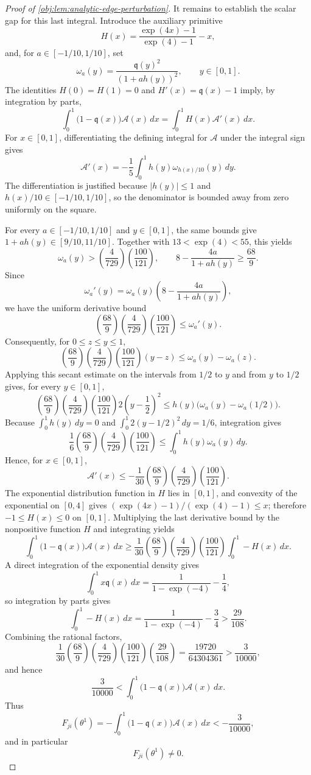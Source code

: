 \begin{proof}[Proof of \cref{obj:lem:analytic-edge-perturbation}]
It remains to establish the scalar gap for this last integral.  Introduce the auxiliary primitive
\[
H(x)=\frac{\exp(4x)-1}{\exp(4)-1}-x,
\]
and, for \(a\in[-1/10,1/10]\), set
\[
\omega_a(y)=\frac{\mathfrak q(y)^2}{(1+a h(y))^2},
\qquad y\in[0,1].
\]
The identities \(H(0)=H(1)=0\) and \(H'(x)=\mathfrak q(x)-1\) imply, by integration by parts,
\[
\int_0^1 \bigl(1-\mathfrak q(x)\bigr)\mathcal A(x)\,dx
=\int_0^1 H(x)\mathcal A'(x)\,dx .
\]
For \(x\in[0,1]\), differentiating the defining integral for \(\mathcal A\) under the integral sign gives
\[
\mathcal A'(x)
=-\frac15\int_0^1 h(y)\omega_{h(x)/10}(y)\,dy .
\]
The differentiation is justified because \(|h(y)|\le1\) and \(h(x)/10\in[-1/10,1/10]\), so the denominator is bounded away from zero uniformly on the square.

For every \(a\in[-1/10,1/10]\) and \(y\in[0,1]\), the same bounds give \(1+a h(y)\in[9/10,11/10]\).  Together with \(13<\exp(4)<55\), this yields
\[
\omega_a(y)>\left(\frac{4}{729}\right)\left(\frac{100}{121}\right),
\qquad
8-\frac{4a}{1+a h(y)}\ge \frac{68}{9}.
\]
Since
\[
\omega_a'(y)
=\omega_a(y)\left(8-\frac{4a}{1+a h(y)}\right),
\]
we have the uniform derivative bound
\[
\left(\frac{68}{9}\right)\left(\frac{4}{729}\right)\left(\frac{100}{121}\right)
\le \omega_a'(y).
\]
Consequently, for \(0\le z\le y\le1\),
\[
\left(\frac{68}{9}\right)\left(\frac{4}{729}\right)\left(\frac{100}{121}\right)(y-z)
\le \omega_a(y)-\omega_a(z).
\]
Applying this secant estimate on the intervals from \(1/2\) to \(y\) and from \(y\) to \(1/2\) gives, for every \(y\in[0,1]\),
\[
\left(\frac{68}{9}\right)\left(\frac{4}{729}\right)\left(\frac{100}{121}\right)2\left(y-\frac12\right)^2
\le h(y)\bigl(\omega_a(y)-\omega_a(1/2)\bigr).
\]
Because \(\int_0^1 h(y)\,dy=0\) and \(\int_0^1 2(y-1/2)^2\,dy=1/6\), integration gives
\[
\frac16\left(\frac{68}{9}\right)\left(\frac{4}{729}\right)\left(\frac{100}{121}\right)
\le
\int_0^1 h(y)\omega_a(y)\,dy .
\]
Hence, for \(x\in[0,1]\),
\[
\mathcal A'(x)
\le
-\frac1{30}\left(\frac{68}{9}\right)\left(\frac{4}{729}\right)\left(\frac{100}{121}\right).
\]
The exponential distribution function in \(H\) lies in \([0,1]\), and convexity of the exponential on \([0,4]\) gives \((\exp(4x)-1)/(\exp(4)-1)\le x\); therefore \(-1\le H(x)\le0\) on \([0,1]\).  Multiplying the last derivative bound by the nonpositive function \(H\) and integrating yields
\[
\int_0^1 \bigl(1-\mathfrak q(x)\bigr)\mathcal A(x)\,dx
\ge
\frac1{30}\left(\frac{68}{9}\right)\left(\frac{4}{729}\right)\left(\frac{100}{121}\right)
\int_0^1 -H(x)\,dx .
\]
A direct integration of the exponential density gives
\[
\int_0^1 x\mathfrak q(x)\,dx
=\frac{1}{1-\exp(-4)}-\frac14,
\]
so integration by parts gives
\[
\int_0^1 -H(x)\,dx
=\frac{1}{1-\exp(-4)}-\frac34
>\frac{29}{108}.
\]
Combining the rational factors,
\[
\frac1{30}\left(\frac{68}{9}\right)\left(\frac{4}{729}\right)\left(\frac{100}{121}\right)\left(\frac{29}{108}\right)
=\frac{19720}{64304361}
>\frac{3}{10000},
\]
and hence
\[
\frac{3}{10000}
<
\int_0^1 \bigl(1-\mathfrak q(x)\bigr)\mathcal A(x)\,dx .
\]
Thus
\[
F_{ji}(\theta^1)
=-\int_0^1 \bigl(1-\mathfrak q(x)\bigr)\mathcal A(x)\,dx
< -\frac{3}{10000},
\]
and in particular
\[
F_{ji}(\theta^1)\ne0 .
\] %


\end{proof}
